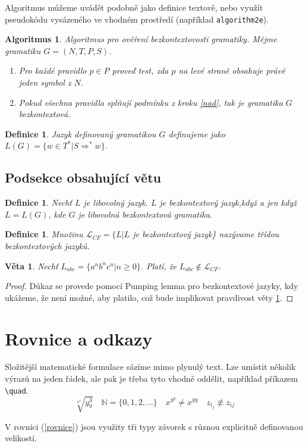 \documentclass[a4paper,11pt,twocolumn]{article}
\newtheorem{algorithm}[theorem]{Algoritmus}
\newtheorem{definition}[theorem]{Definice}
\newtheorem{lemma}{Věta}
\begin{document}
Algoritmus můžeme uvádět podobně jako definice textově, nebo využít pseudokódu vysázeného ve vhodném prostředí (například \texttt{algorithm2e}).

\begin{algorithm}
Algoritmus pro ověření bezkontextovosti gramatiky. Mějme gramatiku $G=(N,T,P,S)$.
\begin {enumerate}
\item\label{nad} Pro každé pravidlo $p\in P$ proveď test, zda $p$ na levé straně obsahuje právě jeden symbol z $N$.
\item Pokud všechna pravidla splňují podmínku z kroku \ref{nad}, tak je gramatika $G$ bezkontextová.
\end {enumerate}
\end{algorithm}

\begin{definition}
Jazyk \emph{definovaný gramatikou $G$ definujeme jako $L(G)=\{w\in T^*|S\Rightarrow^* w\}$.}
\end{definition}

\subsection{Podsekce obsahující větu}

\begin{definition}
\emph{Nechť $L$ je libovolný jazyk. $L$ je} bezkontextový jazyk,\emph{když a jen když $L=L(G)$, kde $G$ je libovolná bezkontextová gramatika.}
\end{definition}

\begin{definition}
\emph{Množinu $\mathcal{L}_{CF}=\{L|L$ je bezkontextový jazyk\} nazývame} třídou bezkontextových jazyků.
\end{definition}

\begin{lemma}
\label{veta1} Nechť $L_{abc}=\{a^n b^n c^n | n\geq 0\}$. Platí, že $L_{abc}\notin \mathcal{L}_{CF}$.
\end{lemma}

\begin{proof}
Důkaz se provede pomocí Pumping lemma pro bezkontextové jazyky, kdy ukážeme, že není možné, aby platilo, což bude implikovat pravdivost věty \ref{veta1}.
\end{proof}

\section{Rovnice a odkazy}
Složitější matematické formulace sázíme mimo plynulý text. Lze umístit několik výrazů na jeden řádek, ale pak je třeba tyto vhodně oddělit, například příkazem \verb|\quad|. \vspace{15pt}
$$\sqrt[x^2]{y_{0}^3} \quad \mathbb{N}=\{0,1,2,\dots\} \quad x^{y^y} \neq x^{yy} \quad z_{i_j} \not\equiv z_{ij}$$
\par
V rovnici (\ref{rovnice}) jsou využity tři typy závorek s různou explicitně definovanou velikostí.
\end{document}
